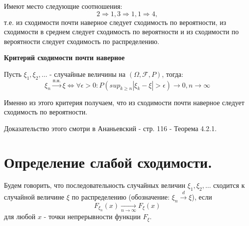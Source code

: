 Имеют место следующие соотношения:
\[ 2 \Rightarrow 1, 3 \Rightarrow 1, 1 \Rightarrow 4, \]
т.е. из сходимости почти наверное следует сходимость по вероятности, из сходимости в среднем следует сходимость по вероятности и из сходимости по вероятности следует сходимость по распределению.
\begin{figure}[H]
\end{figure}

\noindent \textbf{Критерий сходимости почти наверное}

Пусть $\xi_1,\xi_2,\dots$ - случайные величины на $(\Omega, \mathcal{F},P)$, тогда:
\[\xi_n \overset{\text{п.н.}}{\rightarrow } \xi \Leftrightarrow \forall \epsilon > 0: P(sup_{k\ge n} |\xi_k-\xi| > \epsilon) \rightarrow 0, n \rightarrow \infty\]

Именно из этого критерия получаем, что из сходимости почти наверное следует сходимость по вероятности.
\begin{remark}
	Доказательство этого смотри в Ананьевский - стр. 116 - Теорема 4.2.1.
\end{remark}

\section{Определение слабой сходимости.}

Будем говорить, что последовательность случайных величин $\xi_1, \xi_2, \dots$ сходится к случайной величине $\xi$ по распределению (обозначение: $\xi_n \overset{d}{\to} \xi$), если
\[ F_{\xi_n} (x) \underset{n \to \infty}{\to} F_{\xi} (x) \]
для любой $x$ - точки непрерывности функции $F_{\xi}$.

